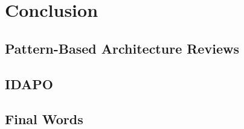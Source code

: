 
\clearpage
\chapter{Conclusion}
\label{ch:conclusion}

\section{Pattern-Based Architecture Reviews}
\section{IDAPO}

\section{Final Words}